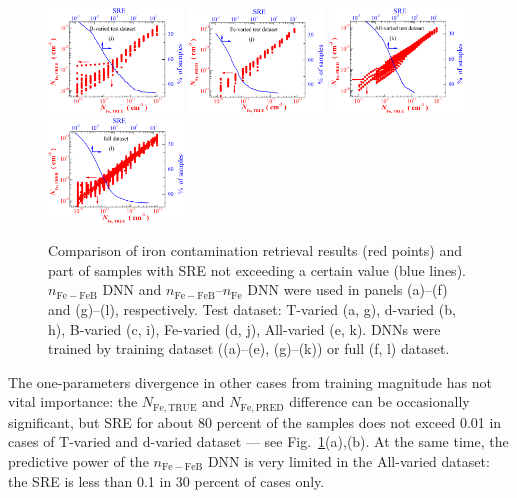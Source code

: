 \documentclass[journal]{IEEEtran}
\begin{document}
\begin{figure}[tb]
\includegraphics[width=0.32\textwidth]{Fig22d}
\includegraphics[width=0.32\textwidth]{Fig22e}
\includegraphics[width=0.32\textwidth]{Fig22f}
\includegraphics[width=0.32\textwidth]{Fig22g}
\caption{Comparison of iron contamination retrieval results (red points)
and part of samples with SRE not exceeding a certain value (blue lines).
$n_\mathrm{Fe-FeB}$ DNN and $n_\mathrm{Fe-FeB}$--$n_\mathrm{Fe}$ DNN were used
in panels (a)--(f) and (g)--(l), respectively.
Test dataset: T-varied (a, g),
d-varied (b, h),
B-varied (c, i),
Fe-varied (d, j),
All-varied (e, k).
DNNs were trained by training dataset ((a)--(e), (g)--(k)) 
or full (f, l) dataset.
}
\label{fig_TrPr}
\end{figure}

The one-parameters divergence in other cases from training magnitude has not vital importance:
the $N_\mathrm{Fe,TRUE}$ and $N_\mathrm{Fe,PRED}$ difference can be occasionally significant,
but SRE for about 80 percent of the samples does not exceed 0.01 in cases of T-varied and d-varied dataset --- see Fig.~\ref{fig_TrPr}(a),(b).
At the same time, the predictive power of the $n_\mathrm{Fe-FeB}$ DNN is very limited in the All-varied dataset:
the SRE is less than 0.1 in 30 percent of cases only.
\end{document}
